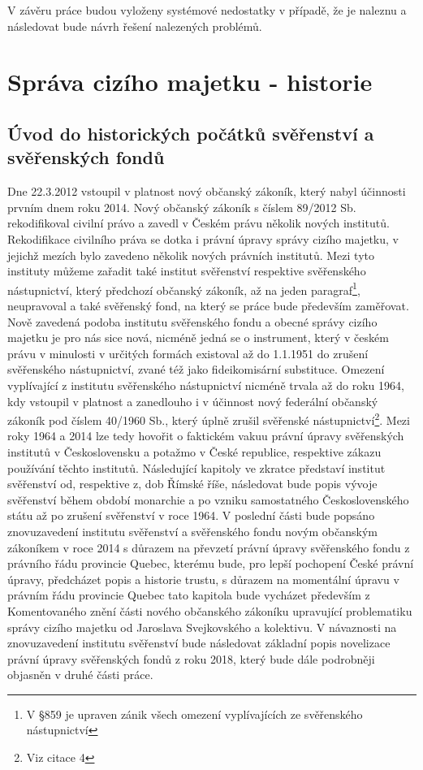 \documentclass{article}
\begin{document}
\indent V závěru práce budou vyloženy systémové nedostatky v případě, že je naleznu a následovat bude návrh řešení nalezených problémů.

\newpage

\section{Správa cizího majetku - historie}

\subsection{Úvod do historických počátků svěřenství a svěřenských fondů}

\indent Dne 22.3.2012 vstoupil v platnost nový občanský zákoník, který nabyl účinnosti prvním dnem roku 2014. Nový občanský zákoník s číslem 89/2012 Sb. rekodifikoval civilní právo a zavedl v Českém právu několik nových institutů. Rekodifikace civilního práva se dotka i právní úpravy správy cizího majetku, v jejichž mezích bylo zavedeno několik nových právních institutů. Mezi tyto instituty můžeme zařadit také institut svěřenství respektive svěřenského nástupnictví, který předchozí občanský zákoník, až na jeden paragraf\footnote{V §859 je upraven zánik všech omezení vyplívajících ze svěřenského nástupnictví}, neupravoval a také svěřenský fond, na který se práce bude především zaměřovat. \\

\indent Nově zavedená podoba institutu svěřenského fondu a obecné správy cizího majetku je pro nás sice nová, nicméně jedná se o instrument, který v českém právu v minulosti v určitých formách existoval až do 1.1.1951 do zrušení svěřens\-kého nástupnictví, zvané též jako fideikomisární substituce. Omezení vyplívající z institutu svěřenského nástupnictví nicméně trvala až do roku 1964, kdy vstoupil v platnost a zanedlouho i v účinnost nový federální občanský zákoník pod číslem 40/1960 Sb., který úplně zrušil svěřenské nástupnictví\footnote{Viz citace 4}. Mezi roky 1964 a 2014 lze tedy hovořit o faktickém vakuu právní úpravy svěřenských institutů v Československu a potažmo v České republice, respektive zákazu používání těchto institutů. Následující kapitoly ve zkratce představí institut svěřenství od, respektive z, dob Římské říše, následovat bude popis vývoje svěřenství během období monarchie a po vzniku samostatného Československého státu až po zrušení svěřenství v roce 1964. V poslední části bude popsáno znovuzavedení institutu svěřenství a svěřenského fondu novým občanským zákoníkem v roce 2014 s důrazem na převzetí právní úpravy svěřenského fondu z právního řádu provincie Quebec, kterému bude, pro lepší pochopení České právní úpravy, předcházet popis a historie trustu, s důrazem na momentální úpravu v právním řádu provincie Quebec tato kapitola bude vycházet především z Komentovaného znění části nového občanského zákoníku upravující problematiku správy cizího majetku od Jaroslava Svejkovského a kolektivu. V návaznosti na znovuzavedení institutu svěřenství bude následovat základní popis novelizace právní úpravy svěřenských fondů z roku 2018, který bude dále podrobněji objasněn v druhé části práce. \\
\end{document}
